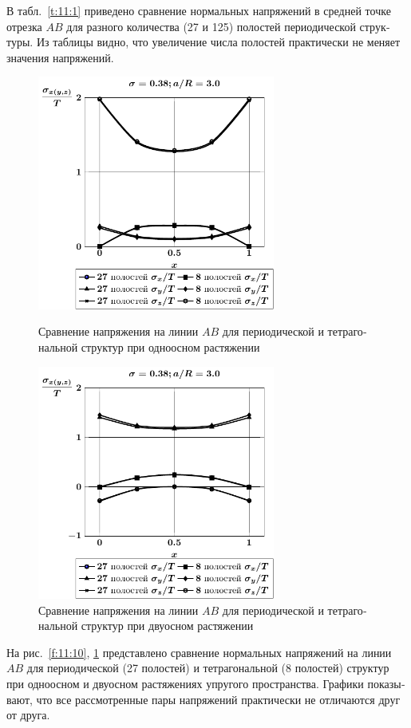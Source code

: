 \begin{russian}
В табл.~\ref{t:11:1} приведено сравнение нормальных напряжений в средней точке отрезка $AB$ для разного количества (27 и 125) полостей периодической структуры. Из таблицы видно, что увеличение числа полостей практически не меняет значения напряжений.

\begin{figure}[h!]
\centering\footnotesize
\parbox[b]{7.5cm}{\centering\includegraphics[width=7.8cm]{spheres-cav27-8-a30-t1.pdf}
\caption{Сравнение напряжения на линии $AB$ для периодической и тетрагональной структур при одноосном растяжении
\label{f:11:10}}}\hfil\hfil
\parbox[b]{7.5cm}{\centering\includegraphics[width=7.8cm]{spheres-cav27-8-a30-t2.pdf}
\caption{Сравнение напряжения на линии $AB$ для периодической и тетрагональной структур при двуосном растяжении
\label{f:11:11}}}
\end{figure}

На рис.~\ref{f:11:10}, \ref{f:11:11} представлено сравнение нормальных напряжений на линии $AB$ для периодической (27 полостей) и тетрагональной (8 полостей) структур при одноосном и двуосном растяжениях упругого пространства. Графики показывают, что все рассмотренные пары напряжений практически не отличаются друг от друга.


\end{russian}
